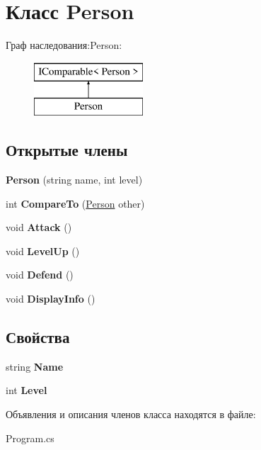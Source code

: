 \hypertarget{class_person}{}\section{Класс Person}
\label{class_person}
Граф наследования\+:Person\+:\begin{figure}[H]
\begin{center}
\leavevmode
\includegraphics[height=2.000000cm]{class_person}
\end{center}
\end{figure}
\subsection*{Открытые члены}
\begin{DoxyCompactItemize}
\item 
\mbox{\label{class_person_a3e1d871cf1e840915cebc8d598da9544}} 
{\bfseries Person} (string name, int level)
\item 
\mbox{\label{class_person_af58e9866597a6bb0caf29b6b5db00ac7}} 
int {\bfseries Compare\+To} (\mbox{\hyperlink{class_person}{Person}} other)
\item 
\mbox{\label{class_person_a93a867277d24bf216fba578eec62f9e5}} 
void {\bfseries Attack} ()
\item 
\mbox{\label{class_person_ac2ce2a4291bd614e8b19ae9ad4bf911f}} 
void {\bfseries Level\+Up} ()
\item 
\mbox{\label{class_person_acfa8a287c9d8a8a095876d7a3a9a3b69}} 
void {\bfseries Defend} ()
\item 
\mbox{\label{class_person_a940c9663ec27be0a67117d55bb2b9051}} 
void {\bfseries Display\+Info} ()
\end{DoxyCompactItemize}
\subsection*{Свойства}
\begin{DoxyCompactItemize}
\item 
\mbox{\label{class_person_a0d6be70593995cc5124b92117e4a80b0}} 
string {\bfseries Name}
\item 
\mbox{\label{class_person_a369848cd6c080f41908f2c9c8ed38df3}} 
int {\bfseries Level}
\end{DoxyCompactItemize}


Объявления и описания членов класса находятся в файле\+:\begin{DoxyCompactItemize}
\item 
Program.\+cs\end{DoxyCompactItemize}
